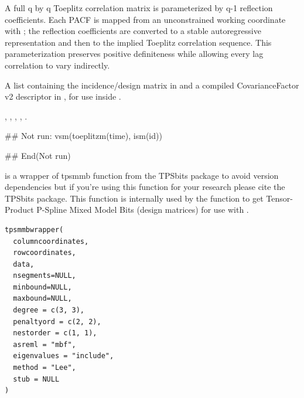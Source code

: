 \documentclass[a4paper]{book}
\begin{document}
%
\begin{Details}\relax
A full q by q Toeplitz correlation matrix is parameterized by q-1 reflection coefficients.  Each PACF is mapped from an unconstrained working coordinate with ; the reflection coefficients are converted to a stable autoregressive representation and then to the implied Toeplitz correlation sequence.  This parameterization preserves positive definiteness while allowing every lag correlation to vary indirectly.
\end{Details}
%
\begin{Value}
A list containing the incidence/design matrix in  and a compiled CovarianceFactor v2 descriptor in , for use inside .
\end{Value}
%
\begin{SeeAlso}\relax
{}, , , , .
\end{SeeAlso}
%
\begin{Examples}
\begin{ExampleCode}
## Not run: 
vsm(toeplitzm(time), ism(id))

## End(Not run)
\end{ExampleCode}
\end{Examples}
%
\begin{Description}\relax
{} is a wrapper of tpsmmb function from the TPSbits package to avoid version dependencies but if you're using this function for your research please cite the TPSbits package. This function is internally used by the  function to get Tensor-Product P-Spline Mixed Model Bits
(design matrices) for use with .
\end{Description}
%
\begin{Usage}
\begin{verbatim}
tpsmmbwrapper(
  columncoordinates,
  rowcoordinates,
  data,
  nsegments=NULL,
  minbound=NULL,
  maxbound=NULL,
  degree = c(3, 3),
  penaltyord = c(2, 2),
  nestorder = c(1, 1),
  asreml = "mbf",
  eigenvalues = "include",
  method = "Lee",
  stub = NULL
)
\end{verbatim}
\end{Usage}
%
\end{document}

